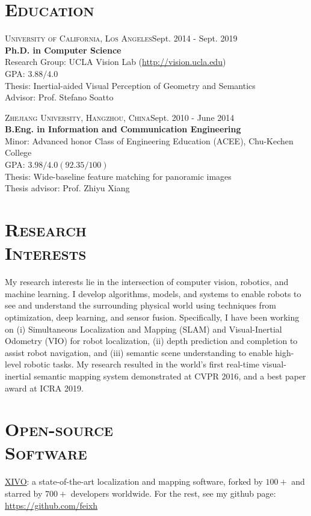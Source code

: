 \documentclass[margin, line, 10pt]{res} %
\begin{document}
\begin{resume}

\section{\textsc{Education}}
\textsc{University of California, Los Angeles}\hfill{Sept. 2014 - Sept. 2019}\\
{\bf Ph.D. in Computer Science}\\
Research Group: UCLA Vision Lab (\url{http://vision.ucla.edu})\\
GPA: $3.88/4.0$ \\
Thesis: Inertial-aided Visual Perception of Geometry and Semantics \\
Advisor: Prof. Stefano Soatto

\textsc{Zhejiang University, Hangzhou, China}\hfill{Sept. 2010 - June 2014}\\
{\bf B.Eng. in Information and Communication Engineering}\\
Minor: Advanced honor Class of Engineering Education (ACEE), Chu-Kechen College\\
GPA: $3.98/4.0 (92.35/100)$ \\
Thesis: Wide-baseline feature matching for panoramic images\\
Thesis advisor: Prof. Zhiyu Xiang\\

\section{\textsc{Research\\Interests}}
My research interests lie in the intersection of computer vision, robotics, and machine learning. I develop algorithms, models, and systems to enable robots to see and understand the surrounding physical world using techniques from optimization, deep learning, and sensor fusion. Specifically, I have been working on (i) Simultaneous Localization and Mapping (SLAM) and Visual-Inertial Odometry (VIO) for robot localization, (ii) depth prediction and completion to assist robot navigation, and (iii) semantic scene understanding to enable high-level robotic tasks. My research resulted in the world's first real-time visual-inertial semantic mapping system demonstrated at CVPR 2016, and a best paper award at ICRA 2019.

\section{\textsc{Open-source\\Software}}
\href{https://github.com/ucla-vision/xivo}{XIVO}: a state-of-the-art localization and mapping software, forked by $100+$ and starred by $700+$ developers worldwide.
For the rest, see my github page: \url{https://github.com/feixh}


\end{resume}
\end{document}
